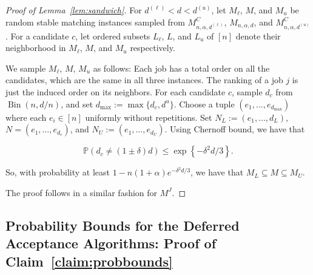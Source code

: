 \documentclass[11pt]{amsart}
\begin{document}
\begin{proof}[Proof of Lemma~\ref{lem:sandwich}]
For $d^{(\ell)} < d < d^{(u)}$, let $M_{\ell}$, $M$, and $M_u$ be random stable matching instances sampled from $M^C_{n,\alpha,d^{(\ell)}}$, $M_{n,\alpha,d}$, and $M^C_{n,\alpha, d^{(u)}}$. For a candidate $c$, let ordered subsets $L_{\ell}$, $L$, and $L_u$ of $[n]$ denote their neighborhood in $M_{\ell}$, $M$, and $M_u$ respectively.

We sample $M_{\ell}$, $M$, $M_{u}$ as follows: Each job has a total order on all the candidates, which are the same in all three instances. The ranking of a job $j$ is just the induced order on its neighbors. For each candidate $c$, sample $d_c$ from $\operatorname{Bin}(n,d/n)$, and set $d_{\max} := \max\{d_c,d^u\}$. Choose a tuple $(e_1,\ldots, e_{d_{\max}})$ where each $e_i \in [n]$ uniformly without repetitions. Set $N_L := (e_1,\ldots,d_L)$, $N = (e_1,\ldots,e_{d_c})$, and $N_{U}:=(e_1,\ldots,e_{d_U})$. Using Chernoff bound, we have that 

\[
\mathbb{P}(d_c\neq (1 \pm \delta)d) \leq \exp\left\{-\delta^2 d/3\right\}.
\]

So, with probability at least $1 - n(1+\alpha)e^{-\delta^2d/3}$, we have that $M_L \subseteq M \subseteq M_U$.

The proof follows in a similar fashion for $M^J$.
\end{proof}

\subsection{Probability Bounds for the Deferred Acceptance Algorithms: Proof of Claim~\ref{claim:probbounds}}
\end{document}
